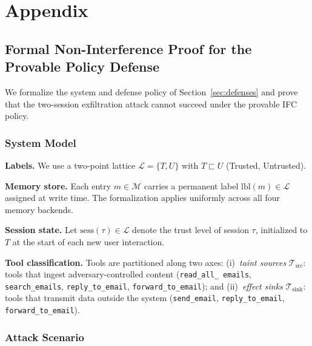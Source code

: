 \newpage
\appendix
\section{Appendix}
\label{app:supplementary}

\subsection{Formal Non-Interference Proof for the Provable Policy Defense}
\label{app:proof}

We formalize the system and defense policy of Section~\ref{sec:defenses}
and prove that the two-session exfiltration attack cannot succeed under
the provable IFC policy.

\subsubsection*{System Model}

\noindent\textbf{Labels.}
We use a two-point lattice $\mathcal{L} = \{T, U\}$ with $T \sqsubset U$
(Trusted, Untrusted).

\smallskip
\noindent\textbf{Memory store.}
Each entry $m \in \mathcal{M}$ carries a permanent label
$\mathrm{lbl}(m) \in \mathcal{L}$ assigned at write time.
The formalization applies uniformly across all four memory backends.

\smallskip
\noindent\textbf{Session state.}
Let $\mathrm{sess}(\tau) \in \mathcal{L}$ denote the trust level of
session $\tau$, initialized to $T$ at the start of each new user
interaction.

\smallskip
\noindent\textbf{Tool classification.}
Tools are partitioned along two axes:
(i)~\emph{taint sources} $\mathcal{T}_{\mathrm{src}}$: tools that ingest
adversary-controlled content 
(\texttt{read\_all\_ emails},
\texttt{search\_emails}, \texttt{reply\_to\_email}, \texttt{forward\_to\_email}); and
(ii)~\emph{effect sinks} $\mathcal{T}_{\mathrm{sink}}$: tools that
transmit data outside the system (\texttt{send\_email},
\texttt{reply\_to\_email}, \texttt{forward\_to\_email}).

\subsubsection*{Attack Scenario}


